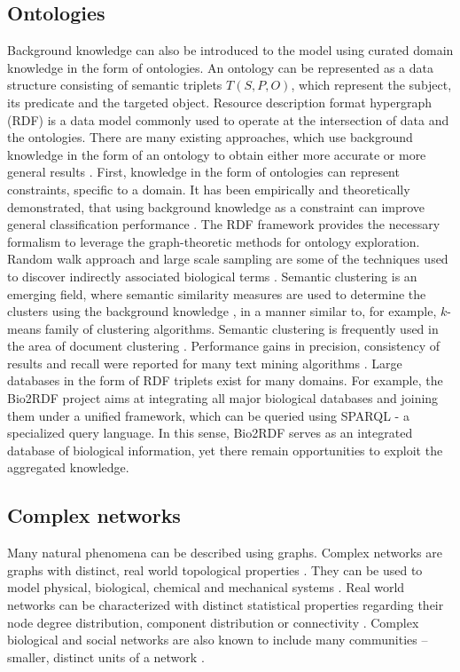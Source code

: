 \documentclass[oribibl,runningheads,a4paper]{llncs}
\begin{document}
\subsection{Ontologies}
Background knowledge can also be introduced to the model using curated domain knowledge in the form of ontologies. An ontology can be represented as a data structure consisting of semantic triplets $T(S,P,O)$, which represent the subject, its predicate and the targeted object. Resource description format hypergraph (RDF) is a data model commonly used to operate at the intersection of data and the ontologies. There are many existing approaches, which use background knowledge in the form of an ontology to obtain either more accurate or more general results \cite{Dou2015}. First, knowledge in the form of ontologies can represent constraints, specific to a domain. It has been empirically and theoretically demonstrated, that using background knowledge as a constraint can improve general classification performance \cite{balcan2013exploiting}. The RDF framework provides the necessary formalism to leverage the graph-theoretic methods for ontology exploration. Random walk approach and large scale sampling are some of the techniques used to discover indirectly associated biological terms \cite{liu2013mining}. Semantic clustering is an emerging field, where semantic similarity measures are used to determine the clusters using the background knowledge \cite{hotho2002ontology}, in a manner similar to, for example, $k$-means family of clustering algorithms. Semantic clustering is frequently used in the area of document clustering \cite{hotho2002ontology}. Performance gains in precision, consistency of results and recall were reported for many text mining algorithms \cite{jing2010knowledge}. Large databases in the form of RDF triplets exist for many domains. For example, the Bio2RDF project \cite{belleau2008bio2rdf} aims at integrating all major biological databases and joining them under a unified framework, which can be queried using SPARQL - a specialized query language. In this sense, Bio2RDF serves as an integrated database of biological information, yet there remain opportunities to exploit the aggregated knowledge.

\subsection{Complex networks}

Many natural phenomena can be described using graphs. Complex networks are graphs with distinct, real world topological properties \cite{cohen2010complex}. They can be used to model physical, biological, chemical and mechanical systems \cite{palla2005uncovering}. Real world networks can be characterized with distinct statistical properties regarding their node degree distribution, component distribution or connectivity \cite{strogatz2001exploring}. Complex biological and social networks are also known to include many communities -- smaller, distinct units of a network \cite{duch2005community}.
\end{document}
